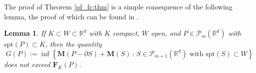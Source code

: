 \documentclass[a4paper,11pt,reqno]{amsart}
\newtheorem{lemma}[theorem]{Lemma}
\theoremstyle{definition}
\numberwithin{equation}{section}
\numberwithin{subsection}{section}
\newcommand{\R}{\mathbb{R}}
\newcommand{\M}{\mathbf{M}}
\newcommand{\I}{\mathscr{I}}
\newcommand{\Fl}{\mathbf{F}}
\newcommand{\spt}{\mathrm{spt}}
\begin{document}
The proof of Theorem \ref{pf_fc:thm} is a simple consequence of the following lemma, the proof of which can be found in \cite[Lemma 4.2.23]{Federer69}. 
\begin{lemma} \label{pf_fc:lem}
If $K \subset W \subset \R^{d}$ with $K$ compact, $W$ open, and $P \in \mathscr{P}_{m}(\R^{d})$ with $\spt(P) \subset K$, then the quantity
\begin{equation} \label{pf_fc:lem1}
G(P) := \inf\left\lbrace \M(P - \partial S) + \M(S) \, \colon \, S \in \mathscr{P}_{m+1}(\R^{d}) \mbox{ with } \spt(S) \subset W \right\rbrace
\end{equation}
does not exceed $\Fl_{K}(P)$.
\end{lemma}
\end{document}
